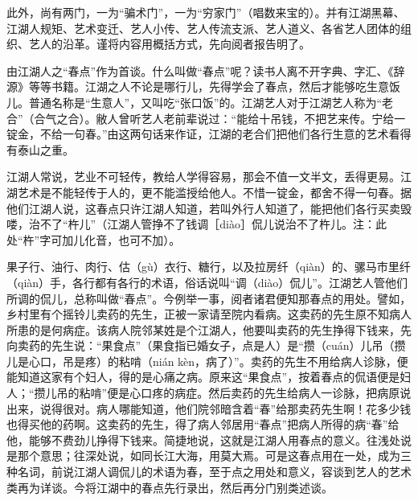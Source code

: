 \documentclass[12pt,UTF8]{ctexbook}
\begin{document}
此外，尚有两门，一为“骗术门”，一为“穷家门”（唱数来宝的）。并有江湖黑幕、江湖人规矩、艺术变迁、艺人小传、艺人传流支派、艺人道义、各省艺人团体的组织、艺人的沿革。谨将内容用概括方式，先向阅者报告明了。

由江湖人之“春点”作为首谈。什么叫做“春点”呢？读书人离不开字典、字汇、《辞源》等等书籍。江湖之人不论是哪行儿，先得学会了春点，然后才能够吃生意饭儿。普通名称是“生意人”，又叫吃“张口饭”的。江湖艺人对于江湖艺人称为“老合”（合气之合）。敝人曾听艺人老前辈说过：“能给十吊钱，不把艺来传。宁给一锭金，不给一句春。”由这两句话来作证，江湖的老合们把他们各行生意的艺术看得有泰山之重。

江湖人常说，艺业不可轻传，教给人学得容易，那会不值一文半文，丢得更易。江湖艺术是不能轻传于人的，更不能滥授给他人。不惜一锭金，都舍不得一句春。据他们江湖人说，这春点只许江湖人知道，若叫外行人知道了，能把他们各行买卖毁喽，治不了“杵儿”（江湖人管挣不了钱调［diào］侃儿说治不了杵儿。注：此处“杵”字可加儿化音，也可不加）。

果子行、油行、肉行、估（gù）衣行、糖行，以及拉房纤（qiàn）的、骡马市里纤（qiàn）手，各行都有各行的术语，俗话说叫“调（diào）侃儿”。江湖艺人管他们所调的侃儿，总称叫做“春点”。今例举一事，阅者诸君便知那春点的用处。譬如，乡村里有个摇铃儿卖药的先生，正被一家请至院内看病。这卖药的先生原不知病人所患的是何病症。该病人院邻某姓是个江湖人，他要叫卖药的先生挣得下钱来，先向卖药的先生说：“果食点”（果食指已婚女子，点是人）是“攒（cuán）儿吊（攒儿是心口，吊是疼）的粘啃（nián kèn，病了）”。卖药的先生不用给病人诊脉，便能知道这家有个妇人，得的是心痛之病。原来这“果食点”，按着春点的侃语便是妇人；“攒儿吊的粘啃”便是心口疼的病症。然后卖药的先生给病人一诊脉，把病原说出来，说得很对。病人哪能知道，他们院邻暗含着“春”给那卖药先生啊！花多少钱也得买他的药啊。这卖药的先生，得了病人邻居用“春点”把病人所得的病“春”给他，能够不费劲儿挣得下钱来。简捷地说，这就是江湖人用春点的意义。往浅处说是那个意思；往深处说，如同长江大海，用莫大焉。可是这春点用在一处，成为三种名词，前说江湖人调侃儿的术语为春，至于点之用处和意义，容谈到艺人的艺术类再为详谈。今将江湖中的春点先行录出，然后再分门别类述谈。
\end{document}
